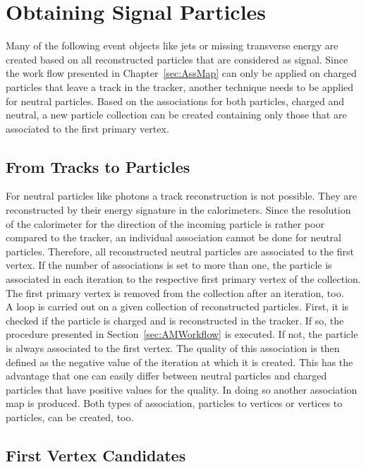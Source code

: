\chapter{Obtaining Signal Particles \label{sec:OSP} }

Many of the following event objects like jets or missing transverse energy are created based on all reconstructed particles that are considered as signal. Since the work flow presented in Chapter~\ref{sec:AssMap} can only be applied on charged particles that leave a track in the tracker, another technique needs to be applied for neutral particles. Based on the associations for both particles, charged and neutral, a new particle collection can be created containing only those that are associated to the first primary vertex.

\section{From Tracks to Particles \label{sec:OSPT2P}}

For neutral particles like photons a track reconstruction is not possible. They are reconstructed by their energy signature in the calorimeters. Since the resolution of the calorimeter for the direction of the incoming particle is rather poor compared to the tracker, an individual association cannot be done for neutral particles. Therefore, all reconstructed neutral particles are associated to the first vertex. If the number of associations is set to more than one, the particle is associated in each iteration to the respective first primary vertex of the collection. The first primary vertex is removed from the collection after an iteration, too. \\
A loop is carried out on a given collection of reconstructed particles. First, it is checked if the particle is charged and is reconstructed in the tracker. If so, the procedure presented in Section~\ref{sec:AMWorkflow} is executed. If not, the particle is always associated to the first vertex. The quality of this association is then defined as the negative value of the iteration at which it is created.  This has the advantage that one can easily differ between neutral particles and charged particles that have positive values for the quality. In doing so another association map is produced. Both types of association, particles to vertices or vertices to particles, can be created, too.

\section{First Vertex Candidates \label{sec:OSPFVC}}

